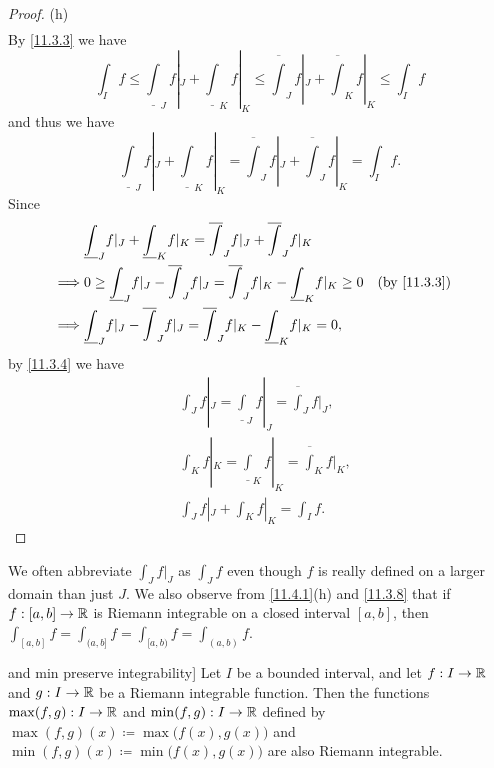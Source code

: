 \begin{proof}{(h)}
\begin{align*}
  \end{align*}
  By \cref{11.3.3} we have
  \[
    \int_I f \leq \underline{\int}_J f|_J + \underline{\int}_K f|_K \leq \overline{\int}_J f|_J + \overline{\int}_K f|_K \leq \int_I f
  \]
  and thus we have
  \[
    \underline{\int}_J f|_J + \underline{\int}_K f|_K = \overline{\int}_J f|_J + \overline{\int}_J f|_K = \int_I f.
  \]
  Since
  \begin{align*}
             & \underline{\int}_J f|_J + \underline{\int}_K f|_K = \overline{\int}_J f|_J + \overline{\int}_J f|_K                                              \\
    \implies & 0 \geq \underline{\int}_J f|_J - \overline{\int}_J f|_J = \overline{\int}_J f|_K - \underline{\int}_K f|_K \geq 0 &  & \text{(by \cref{11.3.3})} \\
    \implies & \underline{\int}_J f|_J - \overline{\int}_J f|_J = \overline{\int}_J f|_K - \underline{\int}_K f|_K = 0,
  \end{align*}
  by \cref{11.3.4} we have
  \begin{align*}
     & \int_J f|_J = \underline{\int}_J f|_J = \overline{\int}_J f|_J, \\
     & \int_K f|_K = \underline{\int}_K f|_K = \overline{\int}_K f|_K, \\
     & \int_J f|_J + \int_K f|_K = \int_I f.
  \end{align*}
\end{proof}

\begin{rmk}\label{11.4.2}
  We often abbreviate \(\int_J f|_J\) as \(\int_J f\) even though \(f\) is really defined on a larger domain than just \(J\).
  We also observe from \cref{11.4.1}(h) and \cref{11.3.8} that if \(f : [a, b] \to \mathbb{R}\) is Riemann integrable on a closed interval \([a, b]\), then \(\int_{[a, b]} f = \int_{(a, b]} f = \int_{[a, b)} f = \int_{(a, b)} f\).
\end{rmk}

\begin{thm} and min preserve integrability]\label{11.4.3}
  Let \(I\) be a bounded interval, and let \(f : I \to \mathbb{R}\) and \(g : I \to \mathbb{R}\) be a Riemann integrable function.
  Then the functions \(\max(f, g) : I \to \mathbb{R}\) and \(\min(f, g) : I \to \mathbb{R}\) defined by \(\max(f, g)(x) \coloneqq \max\big(f(x), g(x)\big)\) and \(\min(f, g)(x) \coloneqq \min\big(f(x), g(x)\big)\) are also Riemann integrable.
\end{thm}

